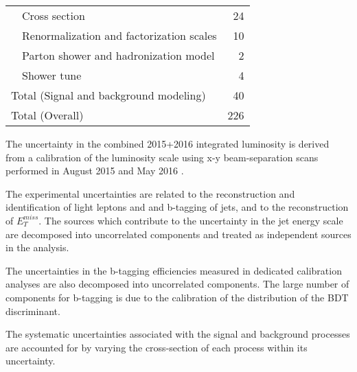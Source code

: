 \begin{table}[h]
\begin{tabular}{lr}
\ \ Cross section                       & 24                  \\
\ \ Renormalization and factorization scales    & 10                  \\
\ \ Parton shower and hadronization model               & 2                   \\
\ \ Shower tune                         & 4                   \\
\hline
Total (Signal and background modeling)       & 40                    \\
\hline\hline
Total (Overall)                             & 226             \\
\hline\hline
\end{tabular}
\label{tab:SystSummary}
\end{table}

The uncertainty in the combined 2015+2016 integrated luminosity is derived from a calibration of the luminosity scale using x-y beam-separation scans performed in August 2015 and May 2016 \cite{lumi}.

The experimental uncertainties are related to the reconstruction and identification of light leptons and and b-tagging of jets, and to the reconstruction of $E^{miss}_T$. The sources which contribute to the uncertainty in the jet energy scale \cite{jes} are decomposed into uncorrelated components and treated as independent sources in the analysis. 

The uncertainties in the b-tagging efficiencies measured in dedicated calibration analyses \cite{btag_cal} are also decomposed into uncorrelated components. The large number of components for b-tagging is due to the calibration of the distribution of the BDT discriminant.

The systematic uncertainties associated with the signal and background processes are accounted for by varying the cross-section of each process within its uncertainty.
